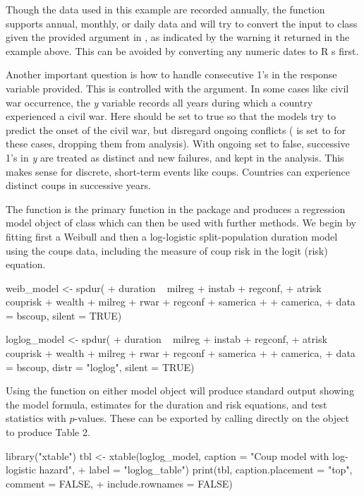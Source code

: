 Though the data used in this example are recorded annually, the function
supports annual, monthly, or daily data and will try to convert the
 input to class  given the provided argument in
, as indicated by the warning it returned in the example above. This 
can be avoided by converting any numeric dates to {\sf R} s first.

Another important question is how to handle consecutive 1's
in the response variable provided. This is controlled with the
 argument. In some cases like civil war occurrence, the
\emph{y} variable records all years during which a country experienced a
civil war. Here  should be set to true so that the models
try to predict the onset of the civil war, but disregard ongoing
conflicts ( is set to  for these cases, dropping
them from analysis). With ongoing set to false, successive 1's in
\emph{y} are treated as distinct and new failures, and kept in the
analysis. This makes sense for discrete, short-term events like coups.
Countries can experience distinct coups in successive years.

The  function is the primary function in the package and
produces a regression model object of class  which can then
be used with further methods. We begin by fitting first a Weibull and
then a log-logistic split-population duration model using the coups
data, including the measure of coup risk in the logit (risk) equation.

\begin{example}
  weib_model <- spdur(
  +    duration ~ milreg + instab + regconf,
  +    atrisk ~ couprisk + wealth + milreg + rwar + regconf + samerica + 
  +      camerica,
  +    data = bscoup, silent = TRUE)

  loglog_model <- spdur(
  +    duration ~ milreg + instab + regconf,
  +    atrisk ~ couprisk + wealth + milreg + rwar + regconf + samerica + 
  +      camerica,
  +    data = bscoup, distr = "loglog", silent = TRUE)
\end{example}

Using the  function on either model object will produce
standard output showing the model formula, estimates for the duration
and risk equations, and test statistics with \(p\)-values. These can be
exported by calling \citep[see][]{dahl2016xtable} directly on the  object to
produce Table 2.

\begin{example}
  library("xtable")
  tbl <- xtable(loglog_model, caption = "Coup model with log-logistic hazard",
  +    label = "loglog_table")
  print(tbl, caption.placement = "top", comment = FALSE, 
  +    include.rownames = FALSE)
\end{example}

